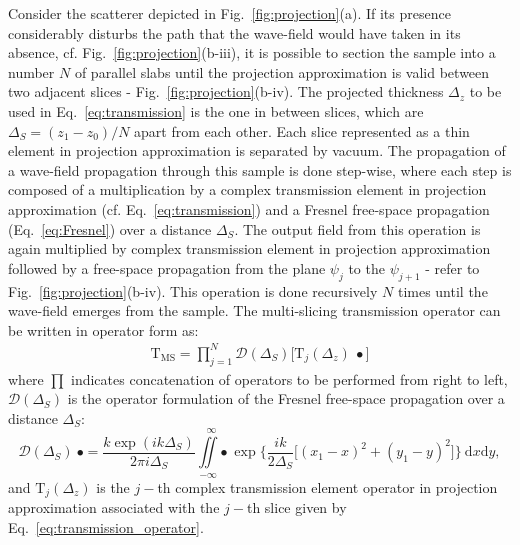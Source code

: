 \begin{refsection}
Consider the scatterer depicted in Fig.~\ref{fig:projection}(a). If its presence considerably disturbs the path that the wave-field would have taken in its absence, cf. Fig.~\ref{fig:projection}(b-$\mathrm{iii}$), it is possible to section the sample into a number $N$ of parallel slabs until the projection approximation is valid between two adjacent slices - Fig.~\ref{fig:projection}(b-$\mathrm{iv}$). The projected thickness $\Delta_z$ to be used in Eq.~\ref{eq:transmission} is the one in  between slices, which are $\Delta_S=(z_1 - z_0)/N$ apart from each other. Each slice represented as a thin element in projection approximation is separated by vacuum. The propagation of a wave-field propagation through this sample is done step-wise, where each step is composed of a multiplication by a complex transmission element in projection approximation (cf. Eq.~\ref{eq:transmission}) and a Fresnel free-space propagation (Eq.~\ref{eq:Fresnel}) over a distance $\Delta_S$. The output field from this operation is again multiplied by complex transmission element in projection approximation followed by a free-space propagation from the plane $\psi_j$ to the  $\psi_{j+1}$ - refer to Fig.~\ref{fig:projection}(b-$\mathrm{iv}$). This operation is done recursively $N$ times until the wave-field emerges from the sample. The multi-slicing transmission operator can be written in operator form as:
\begin{align}\label{eq:MS}
    \mathrm{T}_\text{MS}=\prod\limits_{j=1}^{N}\mathcal{D}(\Delta_S)\big[\mathrm{T}_j(\Delta_z)~\bullet\big]
\end{align}{}
where $\prod$ indicates concatenation of operators to be performed from right to left, $\mathcal{D}(\Delta_S)$ is the operator formulation of the Fresnel free-space propagation over a distance $\Delta_S$:
\begin{equation}\label{eq:Fresnel_operator}
    \mathcal{D}(\Delta_S)~\bullet=\frac{k\exp{(ik\Delta_S)}}{2\pi i \Delta_S}\iint\limits_{-\infty}^{\hspace{8pt}\infty}{\bullet~\exp{\Bigg\{\frac{ik}{2\Delta_S}\big[(x_1-x)^2+(y_1-y)^2 \big]\Bigg\}}~\mathrm{d}x\mathrm{d}y},
\end{equation}
and $\mathrm{T}_j(\Delta_z)$ is the $j-$th complex transmission element operator in projection approximation associated with the $j-$th slice given by Eq.~\ref{eq:transmission_operator}.


\end{refsection}
